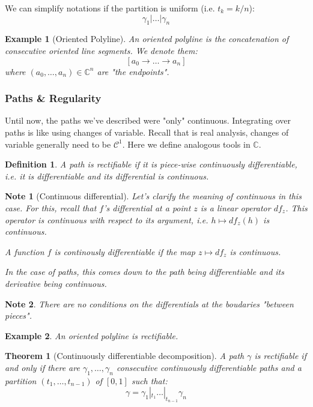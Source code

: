 \documentclass{article}
\newtheorem*{defi}{Definition}
\newtheorem*{note}{Note}
\newtheorem*{example}{Example}
\newtheorem*{thm*}{Theorem}
\begin{document}
We can simplify notations if the partition is uniform (i.e. $t_k = k/n$):
    $$ \gamma_1 | \dots | \gamma_n$$

\begin{example}[Oriented Polyline]
    An oriented polyline is the concatenation of consecutive oriented line segments. We denote them:
    $$[a_0 \rightarrow \dots \rightarrow a_n]$$
    where $(a_0, \dots, a_n)\in\mathbb{C}^n$ are "the endpoints".
\end{example}

\subsubsection{Paths \& Regularity}

Until now, the paths we've described were "only" continuous. Integrating over paths is like using changes of variable. Recall that is real analysis, changes of variable generally need to be $\mathcal{C}^1$. Here we define analogous tools in $\mathbb{C}$.

\begin{defi}
    A path is rectifiable if it is piece-wise continuously differentiable, i.e. it is differentiable and its differential is continuous.
\end{defi}

\begin{note}[Continuous differential]
    Let's clarify the meaning of continuous in this case. For this, recall that $f$'s differential at a point $z$ is a linear operator $df_z$. This operator is continuous with respect to its argument, i.e. $h \mapsto df_z(h)$ is continuous.

    A function $f$ is continously differentiable if the map $z \mapsto df_z$ is continuous.

    In the case of paths, this comes down to the path being differentiable and its derivative being continuous.
\end{note}

\begin{note}
    There are no conditions on the differentials at the boudaries "between pieces".
\end{note}

\begin{example}
    An oriented polyline is rectifiable.
\end{example}

\begin{thm*}[Continuously differentiable decomposition]
    A path $\gamma$ is rectifiable if and only if there are $\gamma_1, \dots, \gamma_n$ consecutive continuously differentiable paths and a partition $(t_1, \dots, t_{n-1})$ of $[0,1]$ such that:
    $$\gamma = \gamma_1 |_{t_1} \dots |_{t_{n-1}} \gamma_n$$
\end{thm*}
\end{document}
